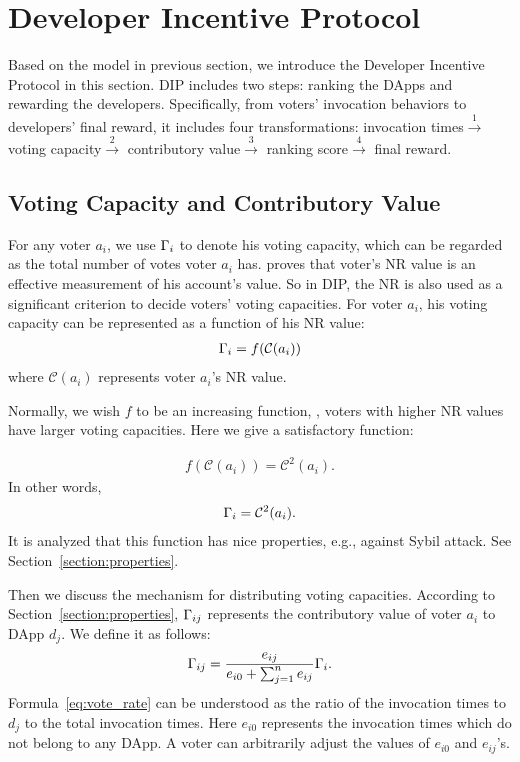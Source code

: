 \section{Developer Incentive Protocol}
\noindent Based on the model in previous section, we introduce the Developer
Incentive Protocol in this section. DIP includes two steps: ranking the DApps
and rewarding the developers. Specifically, from voters' invocation behaviors
to developers' final reward, it includes four transformations: invocation
times$\overset{1}{\rightarrow}$ voting capacity$\overset{2}{\rightarrow}$ contributory
value$\overset{3}{\rightarrow}$ ranking score$\overset{4}{\rightarrow}$ final reward.

\subsection{Voting Capacity and Contributory Value}
\noindent For any voter $a_i$, we use $\Gamma_i$ to denote his voting capacity, which can be regarded as the total number of votes voter $a_i$ has. \cite{Nebulasyellowpaper} proves that voter's NR value is an effective measurement of his account's value. So in DIP, the NR is also used as a significant criterion to decide voters' voting capacities. For voter $a_i$, his voting capacity can be represented as a function of his NR value:
\begin{align}
	\Gamma_i = f(\mathcal{C}(a_i))
\end{align}
where $\mathcal{C}(a_i)$ represents voter $a_i$'s NR value.


Normally, we wish $f$ to be an increasing function, \ie, voters with higher NR
values have larger voting capacities. Here we give a satisfactory function:

\begin{align}
	\label{eq:capacity}
	f(\mathcal{C}(a_i))=\mathcal{C}^2(a_i).
\end{align}
In other words,
\begin{align}
	\Gamma_i = \mathcal{C}^2(a_i).
\end{align}
It is analyzed that this function has nice properties, e.g., against Sybil attack. See Section~\ref{section:properties}.

Then we discuss the mechanism for  distributing voting capacities. According to Section~\ref{section:properties}, $\Gamma_{ij}$ represents the contributory value of voter $a_i$ to DApp $d_j$. We define it as follows:
\begin{align}
	\label{eq:vote_rate}
	\Gamma_{ij} = \frac{e_{ij}}{e_{i0}+\sum_{j=1}^n {e_{ij}}} \Gamma_i.
\end{align}
Formula~\ref{eq:vote_rate} can be understood as the ratio of the invocation
times to $d_j$ to the total invocation times. Here $e_{i0}$ represents the
invocation times which do not belong to any DApp. A voter can arbitrarily adjust the values of $e_{i0}$ and $e_{ij}$'s.

